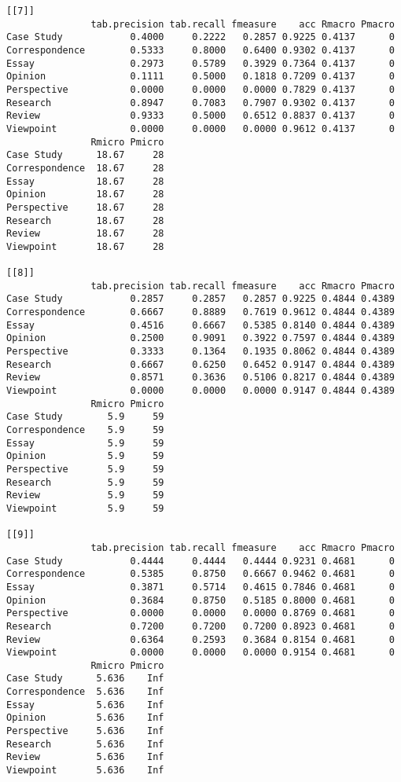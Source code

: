\documentclass[]{article}
\begin{document}
\begin{lstlisting}[frame=single]
[[7]]
               tab.precision tab.recall fmeasure    acc Rmacro Pmacro
Case Study            0.4000     0.2222   0.2857 0.9225 0.4137      0
Correspondence        0.5333     0.8000   0.6400 0.9302 0.4137      0
Essay                 0.2973     0.5789   0.3929 0.7364 0.4137      0
Opinion               0.1111     0.5000   0.1818 0.7209 0.4137      0
Perspective           0.0000     0.0000   0.0000 0.7829 0.4137      0
Research              0.8947     0.7083   0.7907 0.9302 0.4137      0
Review                0.9333     0.5000   0.6512 0.8837 0.4137      0
Viewpoint             0.0000     0.0000   0.0000 0.9612 0.4137      0
               Rmicro Pmicro
Case Study      18.67     28
Correspondence  18.67     28
Essay           18.67     28
Opinion         18.67     28
Perspective     18.67     28
Research        18.67     28
Review          18.67     28
Viewpoint       18.67     28

[[8]]
               tab.precision tab.recall fmeasure    acc Rmacro Pmacro
Case Study            0.2857     0.2857   0.2857 0.9225 0.4844 0.4389
Correspondence        0.6667     0.8889   0.7619 0.9612 0.4844 0.4389
Essay                 0.4516     0.6667   0.5385 0.8140 0.4844 0.4389
Opinion               0.2500     0.9091   0.3922 0.7597 0.4844 0.4389
Perspective           0.3333     0.1364   0.1935 0.8062 0.4844 0.4389
Research              0.6667     0.6250   0.6452 0.9147 0.4844 0.4389
Review                0.8571     0.3636   0.5106 0.8217 0.4844 0.4389
Viewpoint             0.0000     0.0000   0.0000 0.9147 0.4844 0.4389
               Rmicro Pmicro
Case Study        5.9     59
Correspondence    5.9     59
Essay             5.9     59
Opinion           5.9     59
Perspective       5.9     59
Research          5.9     59
Review            5.9     59
Viewpoint         5.9     59

[[9]]
               tab.precision tab.recall fmeasure    acc Rmacro Pmacro
Case Study            0.4444     0.4444   0.4444 0.9231 0.4681      0
Correspondence        0.5385     0.8750   0.6667 0.9462 0.4681      0
Essay                 0.3871     0.5714   0.4615 0.7846 0.4681      0
Opinion               0.3684     0.8750   0.5185 0.8000 0.4681      0
Perspective           0.0000     0.0000   0.0000 0.8769 0.4681      0
Research              0.7200     0.7200   0.7200 0.8923 0.4681      0
Review                0.6364     0.2593   0.3684 0.8154 0.4681      0
Viewpoint             0.0000     0.0000   0.0000 0.9154 0.4681      0
               Rmicro Pmicro
Case Study      5.636    Inf
Correspondence  5.636    Inf
Essay           5.636    Inf
Opinion         5.636    Inf
Perspective     5.636    Inf
Research        5.636    Inf
Review          5.636    Inf
Viewpoint       5.636    Inf


\end{lstlisting}
\end{document}
